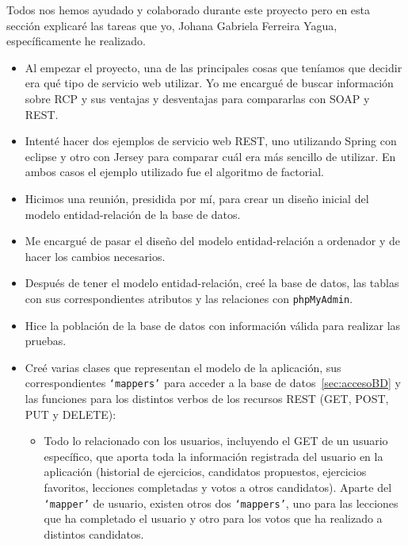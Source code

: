 
Todos nos hemos ayudado y colaborado durante este proyecto pero en esta sección explicaré las tareas que yo, Johana Gabriela Ferreira Yagua, específicamente he realizado.

\begin{itemize}
\item
Al empezar el proyecto, una de las principales cosas que teníamos que decidir era qué tipo de servicio web utilizar. Yo me encargué de buscar información sobre RCP y sus ventajas y desventajas para compararlas con SOAP y REST.

\item
Intenté hacer dos ejemplos de servicio web REST, uno utilizando Spring con eclipse y otro con Jersey para comparar cuál era más sencillo de utilizar. En ambos casos el ejemplo utilizado fue el algoritmo de factorial.

\item
Hicimos una reunión, presidida por mí, para crear un diseño inicial del modelo entidad-relación de la base de datos.

\item
Me encargué de pasar el diseño del modelo entidad-relación a ordenador y de hacer los cambios necesarios.

\item
Después de tener el modelo entidad-relación, creé la base de datos, las tablas con sus correspondientes atributos y las relaciones con \texttt{phpMyAdmin}.

\item
Hice la población de la base de datos con información válida para realizar las pruebas.

\item
Creé varias clases que representan el modelo de la aplicación, sus correspondientes \texttt{`mappers'} para acceder a la base de datos~\ref{sec:accesoBD} y las funciones para los distintos verbos de los recursos REST (GET, POST, PUT y DELETE):

\begin{itemize}
\item
Todo lo relacionado con los usuarios, incluyendo el GET de un usuario específico, que aporta toda la información registrada del usuario en la aplicación (historial de ejercicios, candidatos propuestos, ejercicios favoritos, lecciones completadas y votos a otros candidatos). Aparte del \texttt{`mapper'} de usuario, existen otros dos \texttt{`mappers'}, uno para las lecciones que ha completado el usuario y otro para los votos que ha realizado a distintos candidatos.


\end{itemize}
\end{itemize}
